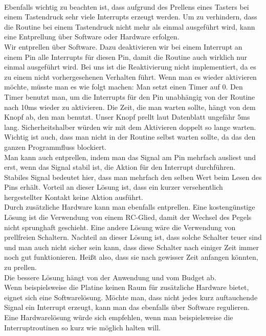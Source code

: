 \documentclass[]{article}
\begin{document}
\\Ebenfalls wichtig zu beachten ist, dass aufgrund des Prellens eines Tasters bei einem Tastendruck sehr viele Interrupts erzeugt werden. Um zu verhindern, dass die Routine bei einem Tastendruck nicht mehr als einmal ausgeführt wird, kann eine Entprellung über Software oder Hardware erfolgen. 
\\Wir entprellen über Software. Dazu deaktivieren wir bei einem Interrupt an einem Pin alle Interrupts für diesen Pin, damit die Routine auch wirklich nur einmal ausgeführt wird. Bei uns ist die Reaktivierung nicht implementiert, da es zu einem nicht vorhergesehenen Verhalten führt. Wenn man es wieder aktivieren möchte, müsste man es wie folgt machen: Man setzt einen Timer auf 0. Den Timer benutzt man, um die Interrupts für den Pin unabhängig von der Routine nach 10ms wieder zu aktivieren. Die Zeit, die man warten sollte, hängt von dem Knopf ab, den man benutzt. Unser Knopf prellt laut Datenblatt ungefähr 5ms lang. Sicherheitshalber würden wir mit dem Aktivieren doppelt so lange warten. Wichtig ist auch, dass man nicht in der Routine selbst warten sollte, da das den ganzen Programmfluss blockiert. 
\\Man kann auch entprellen, indem man das Signal am Pin mehrfach ausliest und erst, wenn das Signal stabil ist, die Aktion für den Interrupt durchführen. Stabiles Signal bedeutet hier, dass man mehrfach den selben Wert beim Lesen des Pins erhält. Vorteil an dieser Lösung ist, dass ein kurzer versehentlich hergestellter Kontakt keine Aktion ausführt.
\\Durch zusätzliche Hardware kann man ebenfalls entprellen. Eine kostengünstige Lösung ist die Verwendung von einem RC-Glied, damit der Wechsel des Pegels nicht sprunghaft geschieht. Eine andere Lösung wäre die Verwendung von prellfreien Schaltern. Nachteil an dieser Lösung ist, dass solche Schalter teuer sind und man auch nicht sicher sein kann, dass diese Schalter nach einiger Zeit immer noch gut funktionieren. Heißt also, dass sie nach gewisser Zeit anfangen könnten, zu prellen.
\\Die bessere Lösung hängt von der Anwendung und vom Budget ab. 
\\Wenn beispielsweise die Platine keinen Raum für zusätzliche Hardware bietet, eignet sich eine Softwarelösung. Möchte man, dass nicht jedes kurz auftauchende Signal ein Interrupt erzeugt, kann man das ebenfalls über Software regulieren. 
\\Eine Hardwarelösung würde sich empfehlen, wenn man beispielsweise die Interruptroutinen so kurz wie möglich halten will. 
\end{document}
